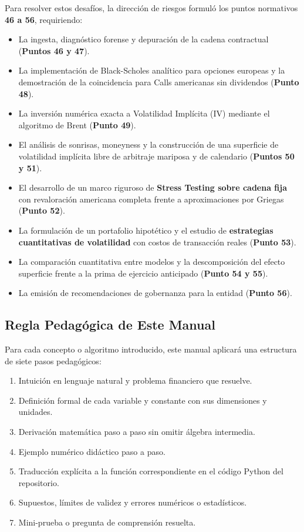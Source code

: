 \documentclass[11pt,a4paper]{article}
\begin{document}
Para resolver estos desafíos, la dirección de riesgos formuló los puntos normativos \textbf{46 a 56}, requiriendo:
\begin{itemize}
    \item La ingesta, diagnóstico forense y depuración de la cadena contractual (\textbf{Puntos 46 y 47}).
    \item La implementación de Black-Scholes analítico para opciones europeas y la demostración de la coincidencia para Calls americanas sin dividendos (\textbf{Punto 48}).
    \item La inversión numérica exacta a Volatilidad Implícita (IV) mediante el algoritmo de Brent (\textbf{Punto 49}).
    \item El análisis de sonrisas, moneyness y la construcción de una superficie de volatilidad implícita libre de arbitraje mariposa y de calendario (\textbf{Puntos 50 y 51}).
    \item El desarrollo de un marco riguroso de \textbf{Stress Testing sobre cadena fija} con revaloración americana completa frente a aproximaciones por Griegas (\textbf{Punto 52}).
    \item La formulación de un portafolio hipotético y el estudio de \textbf{estrategias cuantitativas de volatilidad} con costos de transacción reales (\textbf{Punto 53}).
    \item La comparación cuantitativa entre modelos y la descomposición del efecto superficie frente a la prima de ejercicio anticipado (\textbf{Punto 54 y 55}).
    \item La emisión de recomendaciones de gobernanza para la entidad (\textbf{Punto 56}).
\end{itemize}

\subsection{Regla Pedagógica de Este Manual}
Para cada concepto o algoritmo introducido, este manual aplicará una estructura de siete pasos pedagógicos:
\begin{enumerate}
    \item Intuición en lenguaje natural y problema financiero que resuelve.
    \item Definición formal de cada variable y constante con sus dimensiones y unidades.
    \item Derivación matemática paso a paso sin omitir álgebra intermedia.
    \item Ejemplo numérico didáctico paso a paso.
    \item Traducción explícita a la función correspondiente en el código Python del repositorio.
    \item Supuestos, límites de validez y errores numéricos o estadísticos.
    \item Mini-prueba o pregunta de comprensión resuelta.
\end{enumerate}
\end{document}
